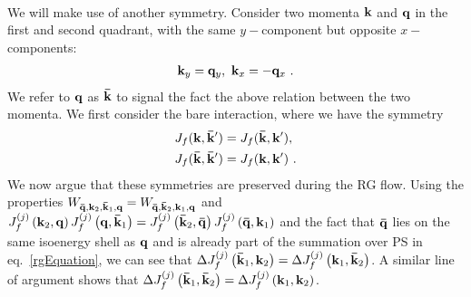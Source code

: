 \documentclass[%
reprint,
superscriptaddress,
groupedaddress,
superscriptaddress,
onecolumn,
]{revtex4-2}
\begin{document}
\par{}\\
We will make use of another symmetry. Consider two momenta \({\bf k}\) and \({\bf q}\) in the first and second quadrant, with the same \(y-\)component but opposite \(x-\)components:
\begin{equation}\begin{aligned}
	{\bf k}_y = {\bf q}_y, ~ {\bf k}_x = -{\bf q}_x~.
\end{aligned}\end{equation}
We refer to \({\bf q}\) as \({\bf \bar k}\) to signal the fact the above relation between the two momenta. We first consider the bare interaction, where we have the symmetry
\begin{equation}\begin{aligned}\label{adjacent}
	J_f({\bf k}, {\bf \bar k}^\prime) = J_f({\bf \bar k}, {\bf k}^\prime),~\\
	J_f({\bf \bar k}, {\bf \bar k}^\prime) = J_f({\bf k}, {\bf k}^\prime)~.
\end{aligned}\end{equation}
We now argue that these symmetries are preserved during the RG flow. Using the properties \(W_{{\bf \bar q}, {\bf k}_2, {\bf \bar k}_1, {\bf q}} = W_{{\bf \bar q}, {\bf \bar k}_2, {\bf k}_1, {\bf q}}\) and  \(J_f^{(j)}\left({\bf k}_2,{\bf q}\right) J_f^{(j)}\left({\bf q},{\bf \bar k}_1\right) = J_f^{(j)}\left({\bf \bar k}_2,{\bf \bar q}\right) J_f^{(j)}\left({\bf \bar q},{\bf k}_1\right)\) and the fact that \({\bf \bar q}\) lies on the same isoenergy shell as \({\bf q}\) and is already part of the summation over PS in eq.~\ref{rgEquation}, we can see that \(\Delta J_f^{(j)}\left({\bf \bar k}_1, {\bf k}_2\right) = \Delta J_f^{(j)}\left({\bf k}_1, {\bf \bar k}_2\right)\). A similar line of argument shows that \(\Delta J_f^{(j)}\left({\bf \bar k}_1, {\bf \bar k}_2\right) = \Delta J_f^{(j)}\left({\bf k}_1, {\bf k}_2\right)\).
\end{document}
